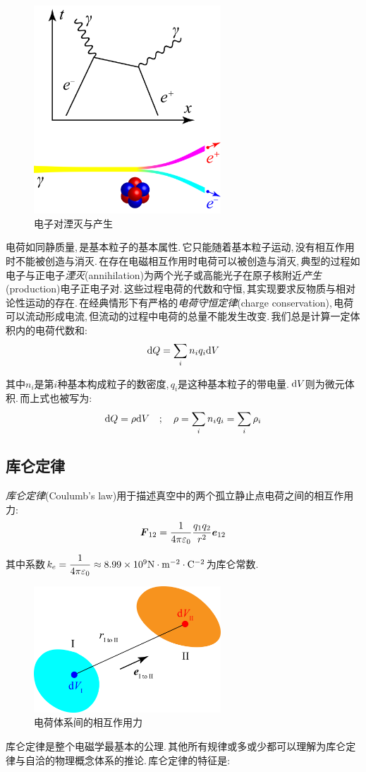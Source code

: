 \begin{figure}
\centering
\includegraphics[width=7cm]{image/7-1-1.png}
\caption{电子对湮灭与产生}
\end{figure}
电荷如同静质量,\,是基本粒子的基本属性.\,它只能随着基本粒子运动,\,没有相互作用时不能被创造与消灭.\,在存在电磁相互作用时电荷可以被创造与消灭,\,典型的过程如电子与正电子\emph{湮灭}(annihilation)为两个光子或高能光子在原子核附近\emph{产生}(production)电子正电子对.\,这些过程电荷的代数和守恒,\,其实现要求反物质与相对论性运动的存在.\,在经典情形下有严格的\emph{电荷守恒定律}(charge conservation),\,电荷可以流动形成电流,\,但流动的过程中电荷的总量不能发生改变.\,我们总是计算一定体积内的电荷代数和:
\[\textrm{d} Q=\sum_i{n_i q_i}\textrm{d} V\]

其中\(n_i\)是第\(i\)种基本构成粒子的数密度,\,\(q_i\)是这种基本粒子的带电量.\,\(\textrm{d} V\)则为微元体积.\,而上式也被写为:
\[\textrm{d} Q=\rho \textrm{d} V\quad;\quad \rho=\sum_i{n_i q_i}=\sum_i \rho_i\]

\subsection{库仑定律}
\emph{库仑定律}(Coulumb's law)用于描述真空中的两个孤立静止点电荷之间的相互作用力:
\[\boldsymbol{F}_{12}=\frac{1}{4\pi\varepsilon_0}\frac{q_1q_2}{r^2}\boldsymbol{e}_{12}\]

其中系数\(k_e=\dfrac{1}{4\pi \varepsilon_0}\approx 8.99\times 10^{9}{\rm N\cdot m^{-2} \cdot C^{-2}}\)为库仑常数.

\begin{figure}
\centering
\includegraphics[width=7cm]{image/7-1-2.png}
\caption{电荷体系间的相互作用力}
\end{figure}
库仑定律是整个电磁学最基本的公理.\,其他所有规律或多或少都可以理解为库仑定律与自洽的物理概念体系的推论.\,库仑定律的特征是:

